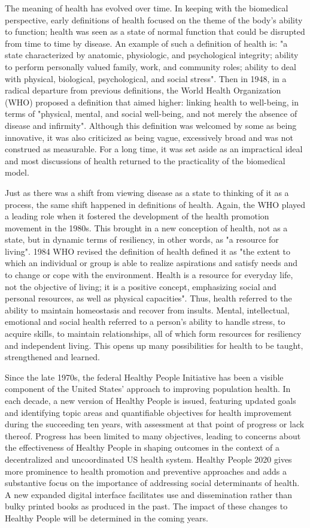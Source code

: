 The meaning of health has evolved over time. In keeping with the
biomedical perspective, early definitions of health focused on the theme
of the body's ability to function; health was seen as a state of normal
function that could be disrupted from time to time by disease. An
example of such a definition of health is: "a state characterized by
anatomic, physiologic, and psychological integrity; ability to perform
personally valued family, work, and community roles; ability to deal
with physical, biological, psychological, and social stress". Then in
1948, in a radical departure from previous definitions, the World Health
Organization (WHO) proposed a definition that aimed higher: linking
health to well-being, in terms of "physical, mental, and social
well-being, and not merely the absence of disease and infirmity".
Although this definition was welcomed by some as being innovative, it
was also criticized as being vague, excessively broad and was not
construed as measurable. For a long time, it was set aside as an
impractical ideal and most discussions of health returned to the
practicality of the biomedical model.

Just as there was a shift from viewing disease as a state to thinking of
it as a process, the same shift happened in definitions of health.
Again, the WHO played a leading role when it fostered the development of
the health promotion movement in the 1980s. This brought in a new
conception of health, not as a state, but in dynamic terms of
resiliency, in other words, as "a resource for living". 1984 WHO revised
the definition of health defined it as "the extent to which an
individual or group is able to realize aspirations and satisfy needs and
to change or cope with the environment. Health is a resource for
everyday life, not the objective of living; it is a positive concept,
emphasizing social and personal resources, as well as physical
capacities". Thus, health referred to the ability to maintain
homeostasis and recover from insults. Mental, intellectual, emotional
and social health referred to a person's ability to handle stress, to
acquire skills, to maintain relationships, all of which form resources
for resiliency and independent living. This opens up many possibilities
for health to be taught, strengthened and learned.

Since the late 1970s, the federal Healthy People Initiative has been a
visible component of the United States' approach to improving population
health. In each decade, a new version of Healthy People is issued,
featuring updated goals and identifying topic areas and quantifiable
objectives for health improvement during the succeeding ten years, with
assessment at that point of progress or lack thereof. Progress has been
limited to many objectives, leading to concerns about the effectiveness
of Healthy People in shaping outcomes in the context of a decentralized
and uncoordinated US health system. Healthy People 2020 gives more
prominence to health promotion and preventive approaches and adds a
substantive focus on the importance of addressing social determinants of
health. A new expanded digital interface facilitates use and
dissemination rather than bulky printed books as produced in the past.
The impact of these changes to Healthy People will be determined in the
coming years.

